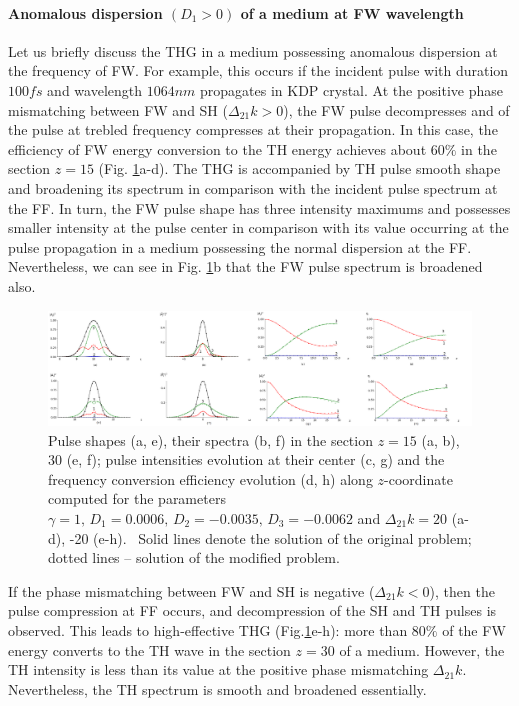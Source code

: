 \documentclass[a4paper, 12pt, onecolumn]{extarticle}
\begin{document}
\paragraph*{Anomalous dispersion $(D_1>0) $ of a medium at FW wavelength}
\label{par:an}

Let us briefly discuss the THG in a medium possessing anomalous dispersion at the frequency of FW. For example, this occurs  if the incident pulse with duration  \(100fs\) and wavelength \(1064nm\) propagates in KDP crystal. At the positive phase mismatching between FW and SH  (\(\Delta_{21}k>0\)), the FW pulse decompresses  and  of the pulse at trebled frequency compresses at their propagation. In this case, the efficiency of FW energy conversion to the TH energy achieves about \(60\%\) in the section \(z=15\) (Fig. \ref{fr:c1_11}a-d). The THG is accompanied by  TH pulse smooth shape and broadening its  spectrum in comparison with the incident pulse spectrum at the FF. In turn, the FW pulse shape has three intensity maximums and possesses smaller intensity at the pulse center in comparison with its value occurring at the pulse propagation in a medium possessing the normal dispersion at the FF. Nevertheless, we can see in Fig. \ref{fr:c1_11}b that the FW pulse spectrum is broadened also.

\begin{figure}[h!] 
\centering 
\includegraphics[width=0.9\linewidth]{Cascade1_11-12}  
\caption{Pulse shapes (a, e), their spectra (b, f) in the section \(z=15\) (a, b), 30 (e, f); pulse intensities evolution at their center (c, g) and the frequency conversion efficiency evolution (d, h) along \(z\)-coordinate computed for the parameters  $\gamma=1,\,  D_1=0.0006,\, D_2=-0.0035,\, D_3=-0.0062$ and  $\Delta_{21} k=20$ (a-d), -20 (e-h). \, Solid lines denote the solution of the original problem; dotted lines -- solution of the modified problem. 
}
\label{fr:c1_11}
\end{figure}

If the phase mismatching between FW and SH is negative (\(\Delta_{21}k<0\)), then the pulse compression at FF occurs, and decompression of the SH and TH pulses is observed. This leads to high-effective THG (Fig.\ref{fr:c1_11}e-h): more than \(80\%\) of the FW energy converts to the TH wave in the section  $z=30$ of a medium. However, the TH intensity is less than its value at the positive phase mismatching \(\Delta_{21}k\). Nevertheless, the TH spectrum is smooth and  broadened essentially.
\end{document}
